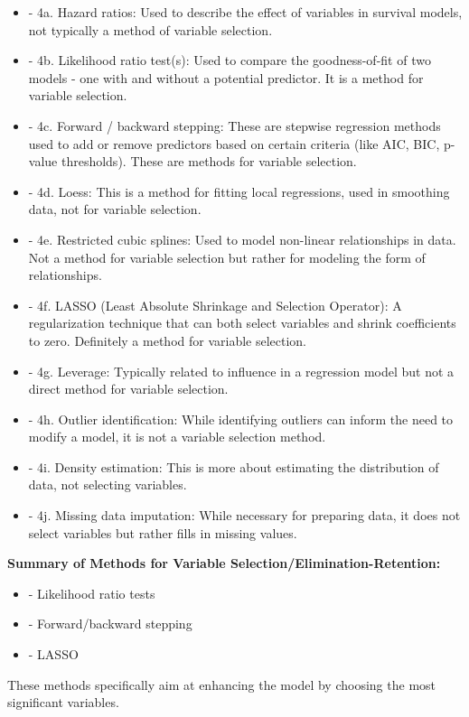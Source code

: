 \documentclass{article}
\begin{document}
\begin{itemize}
    \item - 4a. Hazard ratios: Used to describe the effect of variables in survival models, not typically a method of variable selection.
    \item - 4b. Likelihood ratio test(s): Used to compare the goodness-of-fit of two models - one with and without a potential predictor. It is a method for variable selection.
    \item - 4c. Forward / backward stepping: These are stepwise regression methods used to add or remove predictors based on certain criteria (like AIC, BIC, p-value thresholds). These are methods for variable selection.
    \item - 4d. Loess: This is a method for fitting local regressions, used in smoothing data, not for variable selection.
    \item - 4e. Restricted cubic splines: Used to model non-linear relationships in data. Not a method for variable selection but rather for modeling the form of relationships.
    \item - 4f. LASSO (Least Absolute Shrinkage and Selection Operator): A regularization technique that can both select variables and shrink coefficients to zero. Definitely a method for variable selection.
    \item - 4g. Leverage: Typically related to influence in a regression model but not a direct method for variable selection.
    \item - 4h. Outlier identification: While identifying outliers can inform the need to modify a model, it is not a variable selection method.
    \item - 4i. Density estimation: This is more about estimating the distribution of data, not selecting variables.
    \item - 4j. Missing data imputation: While necessary for preparing data, it does not select variables but rather fills in missing values.
\end{itemize}

\textbf{Summary of Methods for Variable Selection/Elimination-Retention:}
\begin{itemize}
    \item - Likelihood ratio tests
    \item - Forward/backward stepping
    \item - LASSO
\end{itemize}

These methods specifically aim at enhancing the model by choosing the most significant variables.
\newpage
\end{document}
